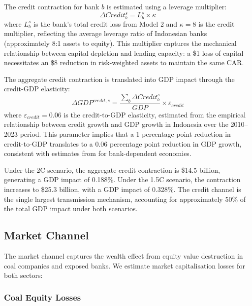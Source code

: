 The credit contraction for bank $b$ is estimated using a leverage multiplier:
\begin{equation}
\label{eq:credit_contraction}
\Delta Credit_b^s = L_b^s \times \kappa
\end{equation}
where $L_b^s$ is the bank's total credit loss from Model 2 and $\kappa = 8$ is the credit multiplier, reflecting the average leverage ratio of Indonesian banks (approximately 8:1 assets to equity). This multiplier captures the mechanical relationship between capital depletion and lending capacity: a \$1 loss of capital necessitates an \$8 reduction in risk-weighted assets to maintain the same CAR.

The aggregate credit contraction is translated into GDP impact through the credit-GDP elasticity:
\begin{equation}
\label{eq:credit_gdp}
\Delta GDP^{credit,s} = \frac{\sum_b \Delta Credit_b^s}{GDP} \times \varepsilon_{credit}
\end{equation}
where $\varepsilon_{credit} = 0.06$ is the credit-to-GDP elasticity, estimated from the empirical relationship between credit growth and GDP growth in Indonesia over the 2010--2023 period. This parameter implies that a 1 percentage point reduction in credit-to-GDP translates to a 0.06 percentage point reduction in GDP growth, consistent with estimates from \citet{GambacortaMarques2011} for bank-dependent economies.

Under the 2\textdegree C scenario, the aggregate credit contraction is \$14.5 billion, generating a GDP impact of 0.188\%. Under the 1.5\textdegree C scenario, the contraction increases to \$25.3 billion, with a GDP impact of 0.328\%. The credit channel is the single largest transmission mechanism, accounting for approximately 50\% of the total GDP impact under both scenarios.

\subsection{Market Channel}
\label{subsec:market_channel}

The market channel captures the wealth effect from equity value destruction in coal companies and exposed banks. We estimate market capitalisation losses for both sectors:

\subsubsection{Coal Equity Losses}

